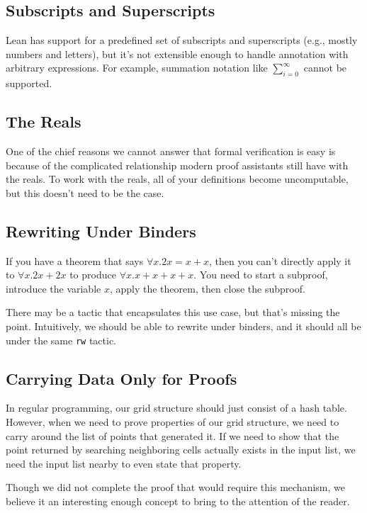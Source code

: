 \documentclass{article}
\begin{document}
\subsection{Subscripts and Superscripts}
Lean has support for a predefined set of subscripts and superscripts (e.g., mostly numbers and letters), but it's not extensible enough to handle annotation with arbitrary expressions.
For example, summation notation like $\sum_{i=0}^{\infty}$ cannot be supported.

\subsection{The Reals}
One of the chief reasons we cannot answer that formal verification is easy is because of the complicated relationship modern proof assistants still have with the reals.
To work with the reals, all of your definitions become uncomputable, but this doesn't need to be the case.

\subsection{Rewriting Under Binders}
If you have a theorem that says $\forall x. 2x = x + x$, then you can't directly apply it to $\forall x. 2x + 2x$ to produce $\forall x. x + x + x + x$.
You need to start a subproof, introduce the variable $x$, apply the theorem, then close the subproof.

There may be a tactic that encapsulates this use case, but that's missing the point.
Intuitively, we should be able to rewrite under binders, and it should all be under the same \texttt{rw} tactic.

\subsection{Carrying Data Only for Proofs}
In regular programming, our grid structure should just consist of a hash table.
However, when we need to prove properties of our grid structure, we need to carry around the list of points that generated it.
If we need to show that the point returned by searching neighboring cells actually exists in the input list, we need the input list nearby to even state that property.

Though we did not complete the proof that would require this mechanism, we believe it an interesting enough concept to bring to the attention of the reader.
\end{document}
